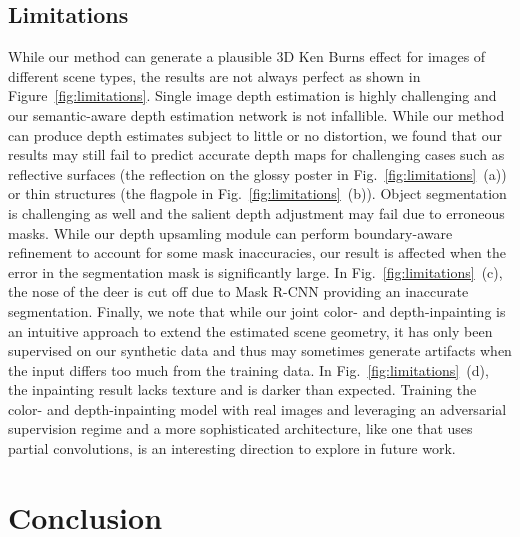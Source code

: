 \documentclass[acmtog,authorversion]{acmart}
\begin{document}
\subsection{Limitations}

While our method can generate a plausible 3D Ken Burns effect for images of different scene types, the results are not always perfect as shown in Figure~\ref{fig:limitations}. Single image depth estimation is highly challenging and our semantic-aware depth estimation network is not infallible. While our method can produce depth estimates subject to little or no distortion, we found that our results may still fail to predict accurate depth maps for challenging cases such as reflective surfaces (the reflection on the glossy poster in Fig.~\ref{fig:limitations}~(a)) or thin structures (the flagpole in Fig.~\ref{fig:limitations}~(b)). Object segmentation is challenging as well and the salient depth adjustment may fail due to erroneous masks. While our depth upsamling module can perform boundary-aware refinement to account for some mask inaccuracies, our result is affected when the error in the segmentation mask is significantly large. In Fig.~\ref{fig:limitations}~(c), the nose of the deer is cut off due to Mask R-CNN providing an inaccurate segmentation. Finally, we note that while our joint color- and depth-inpainting is an intuitive approach to extend the estimated scene geometry, it has only been supervised on our synthetic data and thus may sometimes generate artifacts when the input differs too much from the training data. In Fig.~\ref{fig:limitations}~(d), the inpainting result lacks texture and is darker than expected. Training the color- and depth-inpainting model with real images and leveraging an adversarial supervision regime and a more sophisticated architecture, like one that uses partial convolutions, is an interesting direction to explore in future work. 
\section{Conclusion}
\label{sec:conclusion}
\end{document}
